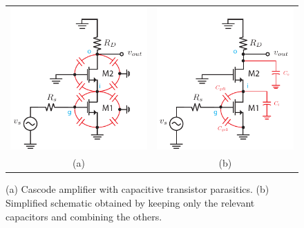 \begin{figure}[tb]
\begin{center}
\begin{tabular}{cc}
\includegraphics[scale=1]{12cascode_caps} &
\includegraphics[scale=1]{13cascode_caps_simple} \\
(a) & (b) \\
\end{tabular}
\end{center}
\caption{(a) Cascode amplifier with capacitive transistor parasitics.  (b) Simplified schematic obtained by keeping only the relevant capacitors and combining the others.} \label{fig:12cascode_caps}
\end{figure}


